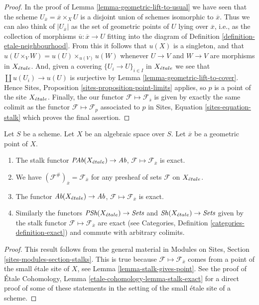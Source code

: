 \begin{proof}
In the proof of
Lemma \ref{lemma-geometric-lift-to-usual}
we have seen that the scheme $U_{\overline{x}} = \overline{x} \times_X U$
is a disjoint union of
schemes isomorphic to $\overline{x}$. Thus we can also think of
$|U_{\overline{x}}|$ as the set of geometric points of $U$ lying over
$\overline{x}$, i.e., as the collection of morphisms
$\overline{u} : \overline{x} \to U$ fitting into the diagram of
Definition \ref{definition-etale-neighbourhood}.
From this it follows that $u(X)$ is a singleton, and that
$u(U \times_V W) = u(U) \times_{u(V)} u(W)$
whenever $U \to V$ and $W \to V$ are morphisms in $X_{\acute{e}tale}$.
And, given a covering $\{U_i \to U\}_{i \in I}$ in $X_{\acute{e}tale}$ we see
that $\coprod u(U_i) \to u(U)$ is surjective by
Lemma \ref{lemma-geometric-lift-to-cover}.
Hence
Sites, Proposition \ref{sites-proposition-point-limits}
applies, so $p$ is a point of the site $X_{\acute{e}tale}$.
Finally, the our functor $\mathcal{F} \mapsto \mathcal{F}_{\overline{s}}$
is given by exactly the same colimit as the functor
$\mathcal{F} \mapsto \mathcal{F}_p$ associated to $p$ in
Sites, Equation \ref{sites-equation-stalk}
which proves the final assertion.
\end{proof}

\begin{lemma}
\label{lemma-stalk-exact}
Let $S$ be a scheme.
Let $X$ be an algebraic space over $S$.
Let $\overline{x}$ be a geometric point of $X$.
\begin{enumerate}
\item The stalk functor
$\textit{PAb}(X_{\acute{e}tale}) \to \textit{Ab}$,
$\mathcal{F}  \mapsto  \mathcal{F}_{\overline{x}}$
is exact.
\item We have $(\mathcal{F}^\#)_{\overline{x}} = \mathcal{F}_{\overline{x}}$
for any presheaf of sets $\mathcal{F}$ on $X_{\acute{e}tale}$.
\item The functor
$\textit{Ab}(X_{\acute{e}tale}) \to \textit{Ab}$,
$\mathcal{F} \mapsto \mathcal{F}_{\overline{x}}$ is exact.
\item Similarly the functors
$\textit{PSh}(X_{\acute{e}tale}) \to \textit{Sets}$ and
$\mathop{\mathit{Sh}}\nolimits(X_{\acute{e}tale}) \to \textit{Sets}$ given by the stalk functor
$\mathcal{F} \mapsto \mathcal{F}_{\overline{x}}$ are exact (see
Categories, Definition \ref{categories-definition-exact})
and commute with arbitrary colimits.
\end{enumerate}
\end{lemma}

\begin{proof}
This result follows from the general material in
Modules on Sites, Section \ref{sites-modules-section-stalks}.
This is true because $\mathcal{F} \mapsto \mathcal{F}_{\overline{x}}$
comes from a point of the small \'etale site of $X$, see
Lemma \ref{lemma-stalk-gives-point}. See the proof of
\'Etale Cohomology, Lemma \ref{etale-cohomology-lemma-stalk-exact}
for a direct proof of some of these statements in the setting of
the small \'etale site of a scheme.
\end{proof}

